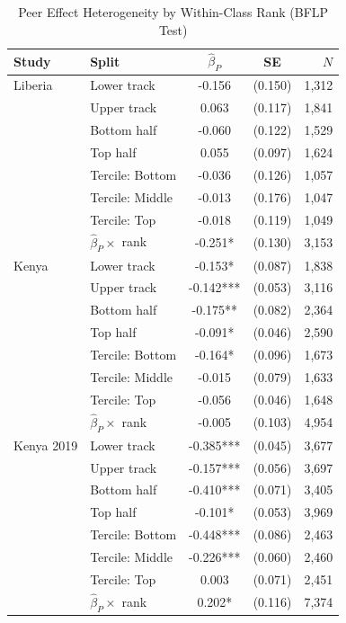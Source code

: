 \begin{table}[htbp]
\centering\small
\caption{Peer Effect Heterogeneity by Within-Class Rank (BFLP Test)}
\label{tab:peer_bflp}
\begin{tabular}{llccr}
\toprule
Study & Split & $\hat{\beta}_P$ & SE & $N$ \\
\midrule
Liberia & Lower track & -0.156 & (0.150) & 1,312 \\
 & Upper track & 0.063 & (0.117) & 1,841 \\
 & Bottom half & -0.060 & (0.122) & 1,529 \\
 & Top half & 0.055 & (0.097) & 1,624 \\
 & Tercile: Bottom & -0.036 & (0.126) & 1,057 \\
 & Tercile: Middle & -0.013 & (0.176) & 1,047 \\
 & Tercile: Top & -0.018 & (0.119) & 1,049 \\
 & $\hat{\beta}_P \times$ rank & -0.251* & (0.130) & 3,153 \\
\addlinespace
Kenya & Lower track & -0.153* & (0.087) & 1,838 \\
 & Upper track & -0.142*** & (0.053) & 3,116 \\
 & Bottom half & -0.175** & (0.082) & 2,364 \\
 & Top half & -0.091* & (0.046) & 2,590 \\
 & Tercile: Bottom & -0.164* & (0.096) & 1,673 \\
 & Tercile: Middle & -0.015 & (0.079) & 1,633 \\
 & Tercile: Top & -0.056 & (0.046) & 1,648 \\
 & $\hat{\beta}_P \times$ rank & -0.005 & (0.103) & 4,954 \\
\addlinespace
Kenya 2019 & Lower track & -0.385*** & (0.045) & 3,677 \\
 & Upper track & -0.157*** & (0.056) & 3,697 \\
 & Bottom half & -0.410*** & (0.071) & 3,405 \\
 & Top half & -0.101* & (0.053) & 3,969 \\
 & Tercile: Bottom & -0.448*** & (0.086) & 2,463 \\
 & Tercile: Middle & -0.226*** & (0.060) & 2,460 \\
 & Tercile: Top & 0.003 & (0.071) & 2,451 \\
 & $\hat{\beta}_P \times$ rank & 0.202* & (0.116) & 7,374 \\
\bottomrule
\end{tabular}
\par\smallskip{}
\end{table}
